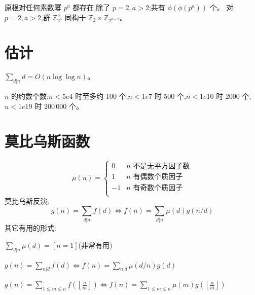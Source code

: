 	原根对任何素数幂 $p^a$ 都存在,除了 $p = 2, a > 2$;共有 $\phi(\phi(p^a))$ 个。
	对 $p = 2, a > 2$,群 $\mathbb Z_{2^a}^\times$ 同构于 $\mathbb Z_2 \times \mathbb Z_{2^{a-2}}$。

\section{估计}
	$\sum_{d|n} d = O(n \log \log n)$。

	$n$ 的约数个数:$n < 5e4$ 时至多约 100 个,$n < 1e7$ 时 500 个,$n < 1e10$ 时 2000 个,$n < 1e19$ 时 200\,000 个。

\section{莫比乌斯函数}
\[
	\mu(n) = \begin{cases} 0 & n \textrm{ 不是无平方因子数}\\ 1 & n \textrm{ 有偶数个质因子}\\ -1 & n \textrm{ 有奇数个质因子}\\\end{cases}
\]
  莫比乌斯反演:
  \[ g(n) = \sum_{d|n} f(d) \Leftrightarrow f(n) = \sum_{d|n} \mu(d)g(n/d) \]
  其它有用的形式:

  $ \sum_{d | n} \mu(d) = [ n = 1] $(非常有用)

  $ g(n) = \sum_{n|d} f(d) \Leftrightarrow f(n) = \sum_{n|d} \mu(d/n)g(d)$

 $ g(n) = \sum_{1 \leq m \leq n} f(\left\lfloor\frac{n}{m}\right \rfloor ) \Leftrightarrow f(n) = \sum_{1\leq m\leq n} \mu(m)g(\left\lfloor\frac{n}{m}\right\rfloor)$
